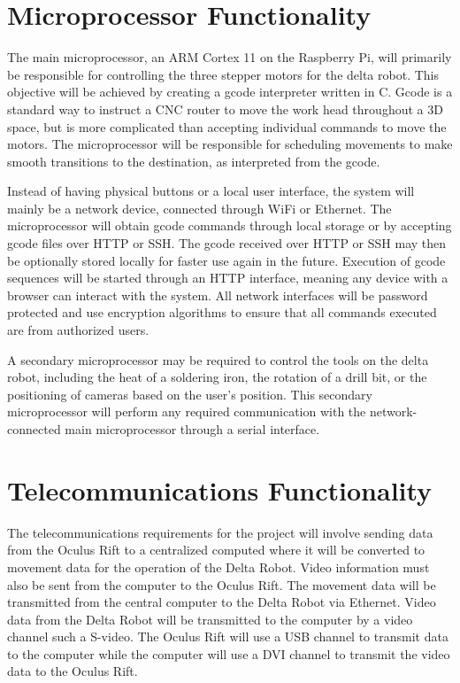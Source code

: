 \documentclass[11pt]{report}
\begin{document}
\section{Microprocessor Functionality}
\par The main microprocessor, an ARM Cortex 11 on the Raspberry Pi, will primarily be responsible for controlling the three stepper motors for the delta robot. This objective will be achieved by creating a gcode interpreter written in C. Gcode is a standard way to instruct a CNC router to move the work head throughout a 3D space, but is more complicated than accepting individual commands to move the motors. The microprocessor will be responsible for scheduling movements to make smooth transitions to the destination, as interpreted from the gcode. 
\par Instead of having physical buttons or a local user interface, the system will mainly be a network device, connected through WiFi or Ethernet. The microprocessor will obtain gcode commands through local storage or by accepting gcode files over HTTP or SSH. The gcode received over HTTP or SSH may then be optionally stored locally for faster use again in the future. Execution of gcode sequences will be started through an HTTP interface, meaning any device with a browser can interact with the system. All network interfaces will be password protected and use encryption algorithms to ensure that all commands executed are from authorized users. 

\par A secondary microprocessor may be required to control the tools on the delta robot, including the heat of a soldering iron, the rotation of a drill bit, or the positioning of cameras based on the user's position. This secondary microprocessor will perform any required communication with the network-connected main microprocessor through a serial interface. 

\section{Telecommunications Functionality}
\par The telecommunications requirements for the project will involve sending data from the Oculus Rift to a centralized computed where it will be converted to movement data for the operation of the Delta Robot. Video information must also be sent from the computer to the Oculus Rift. The movement data will be transmitted from the central computer to the Delta Robot via Ethernet. Video data from the Delta Robot will be transmitted to the computer by a video channel such a S-video. The Oculus Rift will use a USB channel to transmit data to the computer while the computer will use a DVI channel to transmit the video data to the Oculus Rift.
\end{document}
